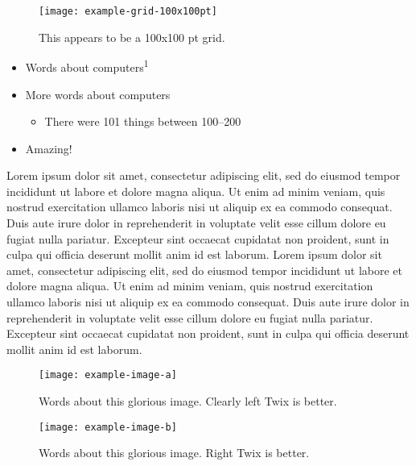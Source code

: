 \documentclass[20pt]{beamer}
\newlength{\colwidth}
\begin{document}
\begin{frame}[t]
\begin{columns}[t]
\begin{column}{\colwidth}
\begin{tcolorbox}[title=Background and Purpose, every float=\centering]
\begin{figure}[htb]
\centering
\texttt{[image: example-grid-100x100pt]}
\caption{This appears to be a 100x100 pt grid.}
\end{figure}

\end{tcolorbox}

\begin{tcolorbox}[title=Methodology]

\begin{itemize}[label=\textbullet, leftmargin=*]
    \item Words about computers\textsuperscript{1} 
    \item More words about computers
    \begin{itemize}[label=\textbullet, leftmargin=*]
        \item There were \num{101} things between \numrange{100}{200}
    \end{itemize}
    \item Amazing!
\end{itemize}

\end{tcolorbox}

\begin{tcolorbox}[title=Etwas]
Lorem ipsum dolor sit amet, consectetur adipiscing elit, sed do eiusmod tempor incididunt ut labore et dolore magna aliqua. 
Ut enim ad minim veniam, quis nostrud exercitation ullamco laboris nisi ut aliquip ex ea commodo consequat. 
Duis aute irure dolor in reprehenderit in voluptate velit esse cillum dolore eu fugiat nulla pariatur. 
Excepteur sint occaecat cupidatat non proident, sunt in culpa qui officia deserunt mollit anim id est laborum. 
Lorem ipsum dolor sit amet, consectetur adipiscing elit, sed do eiusmod tempor incididunt ut labore et dolore magna aliqua. 
Ut enim ad minim veniam, quis nostrud exercitation ullamco laboris nisi ut aliquip ex ea commodo consequat. 
Duis aute irure dolor in reprehenderit in voluptate velit esse cillum dolore eu fugiat nulla pariatur. 
Excepteur sint occaecat cupidatat non proident, sunt in culpa qui officia deserunt mollit anim id est laborum.

\begin{figure}
\centering
\begin{minipage}[t]{0.45\textwidth}
\texttt{[image: example-image-a]}
\caption{Words about this glorious image. Clearly left Twix is better.}
\end{minipage}
\begin{minipage}[t]{0.45\textwidth}
\texttt{[image: example-image-b]}
\caption{Words about this glorious image. Right Twix is better.}
\end{minipage}
\end{figure}


\end{tcolorbox}
\end{column}
\end{columns}
\end{frame}
\end{document}
